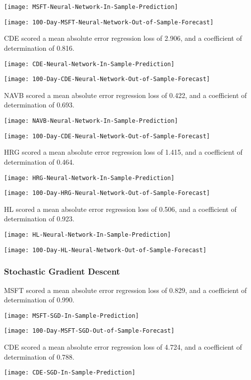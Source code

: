 \texttt{[image: MSFT-Neural-Network-In-Sample-Prediction]}

\texttt{[image: 100-Day-MSFT-Neural-Network-Out-of-Sample-Forecast]}

CDE scored a mean absolute error regression loss of 2.906, and a coefficient of determination of 0.816.

\texttt{[image: CDE-Neural-Network-In-Sample-Prediction]}

\texttt{[image: 100-Day-CDE-Neural-Network-Out-of-Sample-Forecast]}

NAVB scored a mean absolute error regression loss of 0.422, and a coefficient of determination of 0.693.

\texttt{[image: NAVB-Neural-Network-In-Sample-Prediction]}

\texttt{[image: 100-Day-CDE-Neural-Network-Out-of-Sample-Forecast]}

HRG scored a mean absolute error regression loss of 1.415, and a coefficient of determination of 0.464.

\texttt{[image: HRG-Neural-Network-In-Sample-Prediction]}

\texttt{[image: 100-Day-HRG-Neural-Network-Out-of-Sample-Forecast]}

HL scored a mean absolute error regression loss of 0.506, and a coefficient of determination of 0.923.

\texttt{[image: HL-Neural-Network-In-Sample-Prediction]}

\texttt{[image: 100-Day-HL-Neural-Network-Out-of-Sample-Forecast]}

\subsubsection{Stochastic Gradient Descent}
MSFT scored a mean absolute error regression loss of 0.829, and a coefficient of determination of 0.990.

\texttt{[image: MSFT-SGD-In-Sample-Prediction]}

\texttt{[image: 100-Day-MSFT-SGD-Out-of-Sample-Forecast]}

CDE scored a mean absolute error regression loss of 4.724, and a coefficient of determination of 0.788.

\texttt{[image: CDE-SGD-In-Sample-Prediction]}


